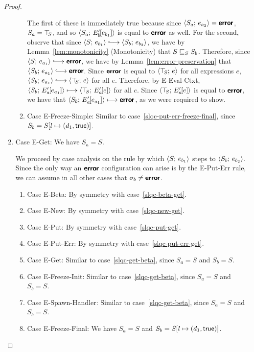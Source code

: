 \begin{proof}
\begin{enumerate}
\begin{enumerate}
      The first of these is immediately true because since
      $\langle S_a;\, e_{a_2} \rangle = \textbf{\textsf{error}}$, $S_a = \top\hspace{-0.85mm}_{S}$, and so
      $\langle S_a;\, E'_b\hspace{-1mm}\left[e_{b_1}\right] \rangle$ is equal to $\textbf{\textsf{error}}$ as
      well.  For the second, observe that since $\config{S}{e_{b_1}}
      \parstepsto \config{S_b}{e_{b_2}}$, we have by
      Lemma~\ref{lem:monotonicity} (Monotonicity) that
      $S \sqsubseteq_S S_b$.  Therefore, since $\config{S}{e_{a_1}}
      \parstepsto \error$, we have by
      Lemma~\ref{lem:error-preservation} that $\config{S_b}{e_{a_1}}
      \parstepsto \error$.  Since $\textbf{\textsf{error}}$ is equal to
      $\langle \top\hspace{-0.85mm}_{S};\, e \rangle$ for all expressions $e$,
      $\config{S_b}{e_{a_1}} \parstepsto \config{\topS}{e}$ for all
      $e$.  Therefore, by {\sc E-Eval-Ctxt},
      $\langle S_b;\, E'_a\hspace{-1mm}\left[e_{a_1}\right] \rangle \longmapsto
      \langle \top\hspace{-0.85mm}_{S};\, E'_a\hspace{-1mm}\left[e\right] \rangle$ for all $e$.  Since
      $\langle \top\hspace{-0.85mm}_{S};\, E'_a\hspace{-1mm}\left[e\right] \rangle$ is equal to $\textbf{\textsf{error}}$, we
      have that $\langle S_b;\, E'_a\hspace{-1mm}\left[e_{a_1}\right] \rangle \longmapsto
      \textbf{\textsf{error}}$, as we were required to show.

    \item \label{slqc-put-err-freeze-simple}Case {\sc
      E-Freeze-Simple}: Similar to
      case~\ref{slqc-put-err-freeze-final}, since $S_b =
      S[l \mapsto (d_1, \textsf{true})]$.

    \end{enumerate}
  \item Case {\sc E-Get}: We have $S_a = S$.

    We proceed by case analysis on the rule by which
    $\langle S;\, e_{b_1} \rangle$ steps to $\langle S_b;\, e_{b_2} \rangle$.  Since the
    only way an $\textbf{\textsf{error}}$ configuration can arise is by the {\sc
      E-Put-Err} rule, we can assume in all other cases that $\sigma_b
    \neq \textbf{\textsf{error}}$.
    \begin{enumerate}
    \item \label{slqc-get-beta}Case {\sc E-Beta}: By symmetry with case~\ref{slqc-beta-get}.
    \item \label{slqc-get-new}Case {\sc E-New}: By symmetry with case~\ref{slqc-new-get}.
    \item \label{slqc-get-put}Case {\sc E-Put}: By symmetry with case~\ref{slqc-put-get}.
    \item \label{slqc-get-put-err}Case {\sc E-Put-Err}: By symmetry with case~\ref{slqc-put-err-get}.
    \item \label{slqc-get-get}Case {\sc E-Get}: Similar to
      case~\ref{slqc-get-beta}, since $S_a = S$ and $S_b = S$.
    \item \label{slqc-get-freeze-init}Case {\sc E-Freeze-Init}:
      Similar to case~\ref{slqc-get-beta}, since $S_a = S$ and $S_b = S$.
    \item \label{slqc-get-spawn-handler}Case {\sc E-Spawn-Handler}:
      Similar to case~\ref{slqc-get-beta}, since $S_a = S$ and $S_b = S$.
    \item \label{slqc-get-freeze-final}Case {\sc E-Freeze-Final}: We
      have $S_a = S$ and $S_b = S[l \mapsto (d_1, \textsf{true})]$.


\end{enumerate}
\end{enumerate}
\end{proof}
